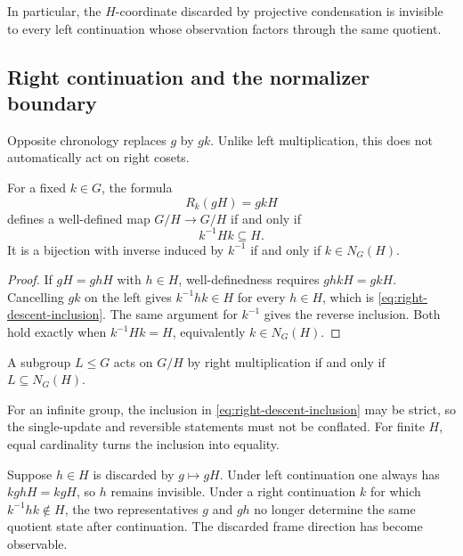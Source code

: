 In particular, the $H$-coordinate discarded by projective condensation is
invisible to every left continuation whose observation factors through the
same quotient.

\subsection{Right continuation and the normalizer boundary}

Opposite chronology replaces $g$ by $gk$.  Unlike left multiplication, this
does not automatically act on right cosets.

\begin{theorem}
\label{thm:right-update-descent}
For a fixed $k\in G$, the formula
\[
  R_k(gH)=gkH
\]
defines a well-defined map $G/H\to G/H$ if and only if
\begin{equation}
  k^{-1}Hk\subseteq H.
  \label{eq:right-descent-inclusion}
\end{equation}
It is a bijection with inverse induced by $k^{-1}$ if and only if
$k\in N_G(H)$.
\end{theorem}

\begin{proof}
If $gH=ghH$ with $h\in H$, well-definedness requires
$ghkH=gkH$.  Cancelling $gk$ on the left gives
$k^{-1}hk\in H$ for every $h\in H$, which is
\eqref{eq:right-descent-inclusion}.  The same argument for $k^{-1}$ gives the
reverse inclusion.  Both hold exactly when $k^{-1}Hk=H$, equivalently
$k\in N_G(H)$.
\end{proof}

\begin{corollary}
\label{cor:right-group-normalizer}
A subgroup $L\le G$ acts on $G/H$ by right multiplication if and only if
$L\subseteq N_G(H)$.
\end{corollary}

For an infinite group, the inclusion in
\eqref{eq:right-descent-inclusion} may be strict, so the single-update and
reversible statements must not be conflated.  For finite $H$, equal
cardinality turns the inclusion into equality.

\begin{corollary}
\label{cor:chronology-dependent-visibility}
Suppose $h\in H$ is discarded by $g\mapsto gH$.  Under left continuation one
always has $kghH=k gH$, so $h$ remains invisible.  Under a right continuation
$k$ for which $k^{-1}hk\notin H$, the two representatives $g$ and $gh$ no
longer determine the same quotient state after continuation.  The discarded
frame direction has become observable.
\end{corollary}

